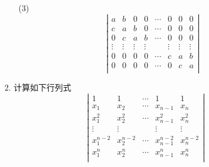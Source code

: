 \begin{itemize}
\begin{itemize}
        \item[(3)]
        \begin{equation}
        \nonumber
        \left|
            \begin{array}{cccccccc}
            a       &b     &0       &0      &\cdots & 0 &0 &0\\
            c       &a     &b     &0      &\cdots & 0 &0 &0\\
            0       &c     &a      &b    &\cdots & 0 &0 &0\\
            \vdots  &\vdots  &\vdots  &\vdots &       & \vdots & \vdots &\vdots\\
            0       &0       &0       &0      &\cdots & c &a &b\\
            0       &0       &0       &0      &\cdots & 0 &c &a\\
            \end{array}
        \right|
        \end{equation} 
        \vspace{2cm}
    \end{itemize}

    \item[2.] 计算如下行列式
    \begin{equation}
    \nonumber
    \left|
        \begin{array}{ccccc}
        1       &1       &\cdots &1 & 1\\
        x_1     &x_2     &\cdots &x_{n-1} & x_n\\
        x_1^2   &x_2^2   &\cdots &x_{n-1}^2 & x_n^2\\
        \vdots  &\vdots  &       &\vdots & \vdots\\
        x_1^{n-2} &x_2^{n-2}     &\cdots &x_{n-1}^{n-2} & x_n^{n-2}\\
        x_1^{n} &x_2^{n}     &\cdots &x_{n-1}^{n} & x_n^{n}\\
        \end{array}
    \right|
    \end{equation} 
\end{itemize}